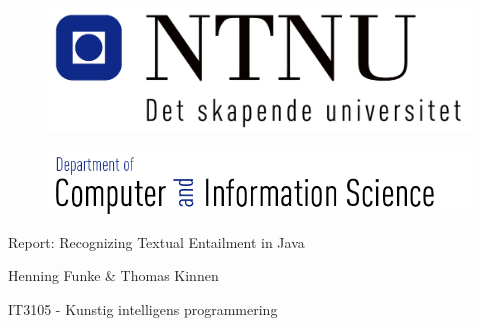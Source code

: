 \pagestyle{empty}

\begin{titlepage}
\begin{center}

\begin{figure}[!htb]
	\begin{center}
		\includegraphics[scale=0.50]{pics/ntnu}
	\end{center}
\end{figure}
\begin{figure}[!htb]
	\begin{center}
		\includegraphics[scale=0.40]{pics/idi}
	\end{center}
\end{figure}
\begin{LARGE}
\vspace{1.2in}

\end{LARGE}
\begin{Huge}
Report: Recognizing Textual Entailment in Java
\vspace{1.7in}


\end{Huge}
\begin{LARGE}
Henning Funke \& Thomas Kinnen \vspace{0.6in}
\end{LARGE}

\begin{Large}
IT3105 - Kunstig intelligens programmering
\vspace{0.8in}
\end{Large}



\end{center}

\end{titlepage}
